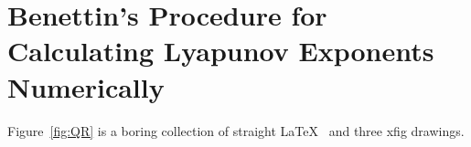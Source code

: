 \documentclass[prelim,showlabels]{book}
\begin{document}

\addtocounter{section}{3}
\section{Benettin's Procedure for Calculating Lyapunov Exponents Numerically}
\label{sec:Benettin}

Figure~\ref{fig:QR} is a boring collection of straight \LaTeX~ and
three xfig drawings.
\end{document}

